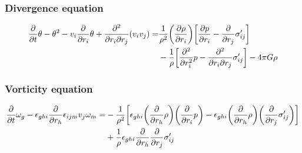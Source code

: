 \subsubsection*{Divergence equation}
\begin{align}
\begin{split}
\pd{t}\theta-\theta^2-v_i\pd{r_i}\theta
+\frac{\partial^2}{\partial r_i \partial r_j}(v_i v_j) =&
\frac{1}{\rho^2}\lra{\ppd{r_i}{\rho}}
\lrb{\ppd{r_i}{p}-\pd{r_j}\sigma'_{ij}}\\
&-\frac{1}{\rho}\lrb{\pdd{r_i}p
-\frac{\partial^2}{\partial r_i \partial r_j}\sigma'_{ij}}
-4\pi G \rho
\end{split}
\label{eq:div}
\end{align}

\subsubsection*{Vorticity equation}
\begin{align}
\begin{split}
\pd{t}\omega_g
-\epsilon_{ghi}\pd{r_h} \epsilon_{ijm} v_j \omega_m =
&-\frac{1}{\rho^2}\lrb{
\epsilon_{ghi} \lra{\pd{r_h}\rho} \lra{\pd{r_i}p}
-\epsilon_{ghi} \lra{\pd{r_h}\rho} \lra{\pd{r_j}\sigma'_{ij}}}\\
&+\frac{1}{\rho}\epsilon_{ghi}\pd{r_h}\pd{r_j}\sigma'_{ij}
\end{split}
\label{eq:vort}
\end{align}

